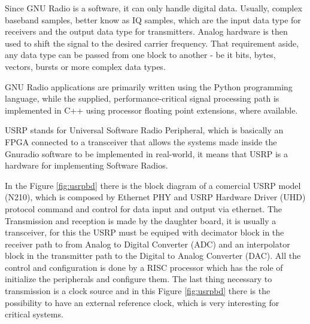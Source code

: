 Since GNU Radio is a software, it can only handle digital data. Usually, complex
baseband samples, better know as IQ samples, which are the input data type for
receivers and the output data type for transmitters. Analog hardware is then
used to shift the signal to the desired carrier frequency. That requirement
aside, any data type can be passed from one block to another - be it bits,
bytes, vectors, bursts or more complex data types.

GNU Radio applications are primarily written using the Python programming
language, while the supplied, performance-critical signal processing path is
implemented in C++ using processor floating point extensions, where available.



USRP stands for Universal Software Radio Peripheral, which is basically an FPGA
connected to a transceiver that allows the systems made inside the Gnuradio
software to be implemented in real-world, it means that USRP is a hardware for
implementing Software Radios.

In the Figure \ref{fig:usrpbd} there is the block diagram of a comercial USRP
model (N210), which is composed by Ethernet PHY and USRP Hardware Driver (UHD)
protocol command and control for data input and output via ethernet. The
Transmission and reception is made by the daughter board, it is usually a
transceiver, for this the USRP must be equiped with  decimator block in the receiver path to
from Analog to Digital Converter (ADC) and an interpolator block in the transmitter path to the
Digital to Analog Converter (DAC). All the control and configuration is done by
a RISC processor which has the role of initialize the peripherals and configure
them. The last thing necessary to transmission is a clock source and in this
Figure \ref{fig:usrpbd} there is the possibility to have an external reference
clock, which is very interesting for critical systems.

